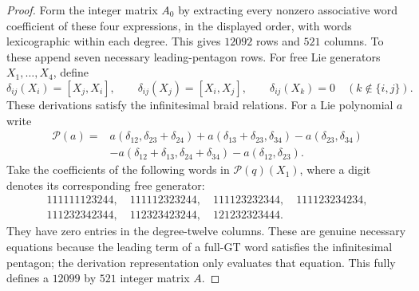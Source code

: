 \begin{proof}
Form the integer matrix $A_0$ by extracting every nonzero
associative word coefficient of these four expressions, in
the displayed order, with words lexicographic within each
degree. This gives $12092$ rows and $521$ columns.
To these append seven necessary leading-pentagon rows.
For free Lie generators $X_1,\ldots,X_4$, define
\[
 \delta_{ij}(X_i)=[X_j,X_i],\qquad
 \delta_{ij}(X_j)=[X_i,X_j],\qquad
 \delta_{ij}(X_k)=0\quad(k\notin\{i,j\}).
\]
These derivations satisfy the infinitesimal braid relations.
For a Lie polynomial $a$ write
\[
\begin{split}
\mathcal P(a)={}&a(\delta_{12},\delta_{23}+\delta_{24})
 +a(\delta_{13}+\delta_{23},\delta_{34})
 -a(\delta_{23},\delta_{34})\\
 &-a(\delta_{12}+\delta_{13},\delta_{24}+\delta_{34})
 -a(\delta_{12},\delta_{23}).
\end{split}
\]
Take the coefficients of the following words in
$\mathcal P(q)(X_1)$, where a digit denotes its corresponding
free generator:
\[
\begin{gathered}
111111123244,\quad111112323244,\quad111123232344,\quad
111123234234,\\
111232342344,\quad112323423244,\quad121232323444.
\end{gathered}
\]
They have zero entries in the degree-twelve columns. These are
genuine necessary equations because the leading term of a
full-GT word satisfies the infinitesimal pentagon; the
derivation representation only evaluates that equation.
This fully defines a $12099$ by $521$ integer matrix $A$.


\end{proof}
